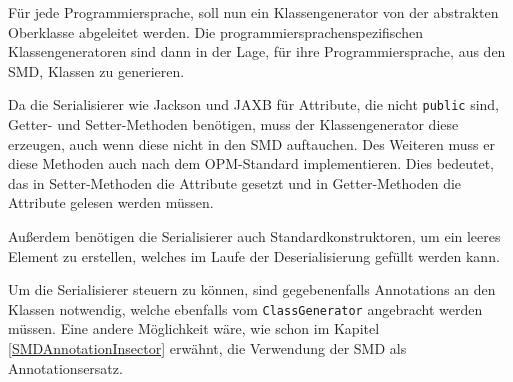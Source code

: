F\"ur jede Programmiersprache, soll nun ein Klassengenerator von der abstrakten Oberklasse abgeleitet werden. Die programmiersprachenspezifischen Klassengeneratoren sind dann in der Lage, f\"ur ihre Programmiersprache, aus den \ac{SMD}, Klassen zu generieren.

Da die Serialisierer wie Jackson und JAXB f\"ur Attribute, die nicht \texttt{public} sind, Getter- und Setter-Methoden ben\"otigen, muss der Klassengenerator diese erzeugen, auch wenn diese nicht in den \ac{SMD} auftauchen. Des Weiteren muss er diese Methoden auch nach dem OPM-Standard implementieren. Dies bedeutet, das in Setter-Methoden die Attribute gesetzt und in Getter-Methoden die Attribute gelesen werden m\"ussen.

Au\ss{}erdem ben\"otigen die Serialisierer auch Standardkonstruktoren, um ein leeres Element zu erstellen, welches im Laufe der Deserialisierung gef\"ullt werden kann.

Um die Serialisierer steuern zu k\"onnen, sind gegebenenfalls Annotations an den Klassen notwendig, welche ebenfalls vom \texttt{ClassGenerator} angebracht werden m\"ussen. Eine andere M\"oglichkeit w\"are, wie schon im Kapitel \ref{SMDAnnotationInsector} erw\"ahnt, die Verwendung der \ac{SMD} als Annotationsersatz.



